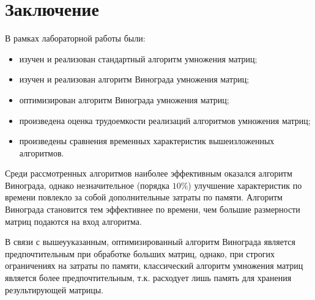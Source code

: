 \chapter*{Заключение}

В рамках лабораторной работы были:
\begin{itemize}
	\item изучен и реализован стандартный алгоритм умножения матриц;
	\item изучен и реализован алгоритм Винограда умножения матриц;
	\item оптимизирован алгоритм Винограда умножения матриц;
	\item произведена оценка трудоемкости реализаций алгоритмов умножения матриц;
	\item произведены сравнения временных характеристик вышеизложенных алгоритмов.
\end{itemize}
 
Среди рассмотренных алгоритмов наиболее эффективным оказался алгоритм Винограда, однако незначительное (порядка $ 10\% $) улучшение характеристик по времени повлекло за собой дополнительные затраты по памяти.
Алгоритм Винограда становится тем эффективнее по времени, чем большие размерности матриц подаются на вход алгоритма.

В связи с вышеууказанным, оптимизированный алгоритм Винограда является предпочтительным при обработке больших матриц, однако, при строгих ограничениях на затраты по памяти, классический алгоритм умножения матриц является более предпочтительным, т.к. расходует лишь память для хранения результирующей матрицы.